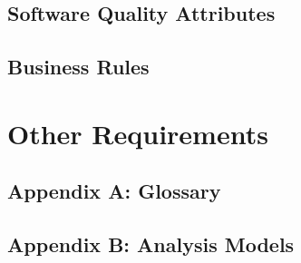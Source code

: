 \documentclass[11pt]{article}
\begin{document}
\subsection{Software Quality Attributes}
\label{sec:orgaa62b25}
\subsection{Business Rules}
\label{sec:org5cf1f28}
\section{Other Requirements}
\label{sec:org9eda1b8}
\subsection*{Appendix A: Glossary}
\label{sec:orgab4db96}
\subsection*{Appendix B: Analysis Models}
\label{sec:org9e93733}
\end{document}
